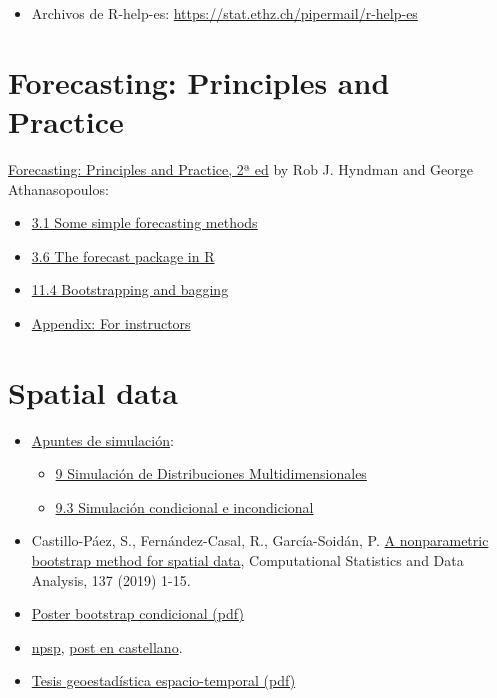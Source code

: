 \documentclass[
]{book}
\theoremstyle{break}
\theoremstyle{nonumberplain}
\begin{document}
\begin{itemize}
\begin{itemize}
    \url{https://grokbase.com/g/r/r-help-es}
  \item
    Archivos de R-help-es: \url{https://stat.ethz.ch/pipermail/r-help-es}
  \end{itemize}
\end{itemize}

\section{Forecasting: Principles and Practice}\label{forecast-links}

\href{https://otexts.com/fpp2}{Forecasting: Principles and Practice, 2ª ed}
by Rob J. Hyndman and George Athanasopoulos:

\begin{itemize}
\item
  \href{https://otexts.com/fpp2/simple-methods.html}{3.1 Some simple forecasting methods}
\item
  \href{https://otexts.com/fpp2/the-forecast-package-in-r.html}{3.6 The forecast package in R}
\item
  \href{https://otexts.com/fpp2/bootstrap.html}{11.4 Bootstrapping and bagging}
\item
  \href{https://otexts.com/fpp2/appendix-for-instructors.html}{Appendix: For instructors}
\end{itemize}

\section{Spatial data}\label{spatial-links}

\begin{itemize}
\item
  \href{https://rubenfcasal.github.io/simbook}{Apuntes de simulación}:

  \begin{itemize}
  \item
    \href{https://rubenfcasal.github.io/simbook/simulacion-de-distribuciones-multidimensionales.html}{9 Simulación de Distribuciones Multidimensionales}
  \item
    \href{https://rubenfcasal.github.io/simbook/simulacion-de-distribuciones-multidimensionales.html\#simulacion-condicional-e-incondicional}{9.3 Simulación condicional e incondicional}
  \end{itemize}
\item
  Castillo-Páez, S., Fernández-Casal, R., García-Soidán, P.
  \href{https://www.sciencedirect.com/science/article/pii/S0167947319300325?via\%3Dihub}{A nonparametric bootstrap method for spatial data},
  Computational Statistics and Data Analysis, 137 (2019) 1-15.
\item
  \href{./Poster_METMA9_2.pdf}{Poster bootstrap condicional (pdf)}
\item
  \href{https://rubenfcasal.github.io/npsp/index.html}{npsp}, \href{https://rubenfcasal.github.io/post/geoestadistica-no-parametrica-con-el-paquete-npsp/}{post en castellano}.
\item
  \href{https://rubenfcasal.github.io/Geoestadistica_espacio-temporal.pdf}{Tesis geoestadística espacio-temporal (pdf)}
\end{itemize}
\end{document}
